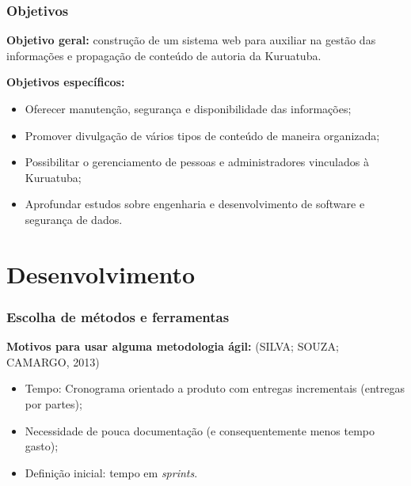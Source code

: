 \documentclass[xcolor=table]{beamer}
\begin{document}
\begin{frame}
    \frametitle{Objetivos}
    \textbf{Objetivo geral:} construção de um sistema web para auxiliar na gestão das informações e propagação de conteúdo de autoria da Kuruatuba.
    
    \textbf{Objetivos específicos:}
    \begin{itemize}
        \item Oferecer manutenção, segurança e disponibilidade das informações;
        \item Promover divulgação de vários tipos de conteúdo de maneira organizada;
        \item Possibilitar o gerenciamento de pessoas e administradores vinculados à Kuruatuba;
        \item Aprofundar estudos sobre engenharia e desenvolvimento de software e segurança de dados.
    \end{itemize}
\end{frame}


\section{Desenvolvimento}
\begin{frame}
    \frametitle{Escolha de métodos e ferramentas}
    \textbf{Motivos para usar alguma metodologia ágil:} (SILVA; SOUZA; CAMARGO, 2013)
    \begin{itemize}
        \item Tempo: Cronograma orientado a produto com entregas incrementais (entregas por partes); %
        \item Necessidade de pouca documentação (e consequentemente menos tempo gasto); 
        \item Definição inicial: tempo em \textit{sprints}.
    \end{itemize}
    
\end{frame}
\end{document}
